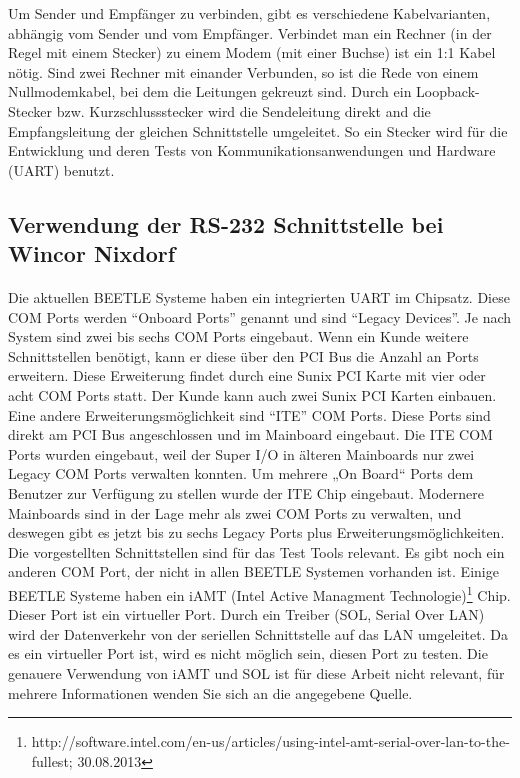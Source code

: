 Um Sender und Empfänger zu verbinden, gibt es verschiedene Kabelvarianten, abhängig vom Sender und vom Empfänger. Verbindet man ein Rechner (in der Regel mit einem Stecker) zu einem Modem (mit einer Buchse) ist ein 1:1 Kabel nötig. Sind zwei Rechner mit einander Verbunden, so ist die Rede von einem Nullmodemkabel, bei dem die Leitungen gekreuzt sind. Durch ein Loopback-Stecker bzw. Kurzschlussstecker wird die Sendeleitung direkt and die Empfangsleitung der gleichen Schnittstelle umgeleitet. So ein Stecker wird für die Entwicklung und deren Tests von Kommunikationsanwendungen und Hardware (UART) benutzt.


\subsection{Verwendung der RS-232 Schnittstelle bei Wincor Nixdorf}
\paragraph{}
Die aktuellen BEETLE Systeme haben ein integrierten UART im Chipsatz. Diese COM Ports werden "`Onboard Ports"' genannt und sind "`Legacy Devices"'. Je nach System sind zwei bis sechs COM Ports eingebaut. Wenn ein Kunde weitere Schnittstellen benötigt, kann er diese über den PCI Bus die Anzahl an Ports erweitern. Diese Erweiterung findet durch eine Sunix PCI Karte mit vier oder acht COM Ports statt. Der Kunde kann auch zwei Sunix PCI Karten einbauen.\\

Eine andere Erweiterungsmöglichkeit sind "`ITE"' COM Ports. Diese Ports sind direkt am PCI Bus angeschlossen und im Mainboard eingebaut. Die ITE COM Ports wurden eingebaut, weil der Super I/O in älteren Mainboards nur zwei Legacy COM Ports verwalten konnten. Um mehrere „On Board“ Ports dem Benutzer zur Verfügung zu stellen wurde der ITE Chip eingebaut. Modernere Mainboards sind in der Lage mehr als zwei COM Ports zu verwalten, und deswegen gibt es jetzt bis zu sechs Legacy Ports plus Erweiterungsmöglichkeiten.\\

Die vorgestellten Schnittstellen sind für das Test Tools relevant. Es gibt noch ein anderen COM Port, der nicht in allen BEETLE Systemen vorhanden ist. Einige BEETLE Systeme haben ein iAMT (Intel Active Managment Technologie)\footnote{http://software.intel.com/en-us/articles/using-intel-amt-serial-over-lan-to-the-fullest; 30.08.2013} Chip. Dieser Port ist ein virtueller Port. Durch ein Treiber (SOL, Serial Over LAN) wird der Datenverkehr von der seriellen Schnittstelle auf das LAN umgeleitet. Da es ein virtueller Port ist, wird es nicht möglich sein, diesen Port zu testen. Die genauere Verwendung von iAMT und SOL ist für diese Arbeit nicht relevant, für mehrere Informationen wenden Sie sich an die angegebene Quelle.\\

